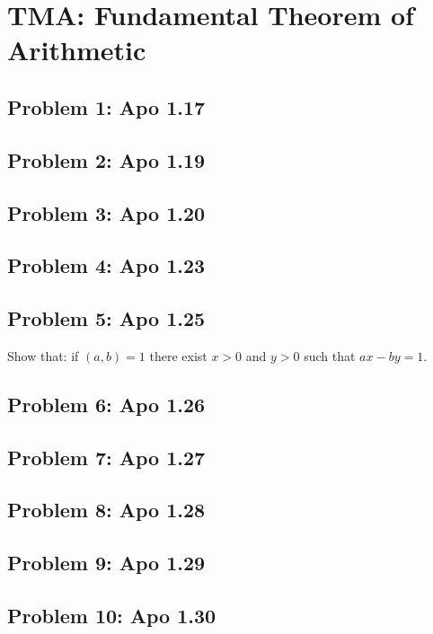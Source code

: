 \section{TMA: Fundamental Theorem of Arithmetic}

\subsection[Problem 1]{Problem 1: Apo 1.17}

\subsection[Problem 2]{Problem 2: Apo 1.19}

\subsection[Problem 3]{Problem 3: Apo 1.20}

\subsection[Problem 4]{Problem 4: Apo 1.23}

\subsection[Problem 5]{Problem 5: Apo 1.25}
Show that: if $(a, b) = 1$ there exist $x >0$ and $y > 0$ such that $ax - by = 1$.

\subsection[Problem 6]{Problem 6: Apo 1.26}

\subsection[Problem 7]{Problem 7: Apo 1.27}

\subsection[Problem 8]{Problem 8: Apo 1.28}

\subsection[Problem 9]{Problem 9: Apo 1.29}

\subsection[Problem 10]{Problem 10: Apo 1.30}